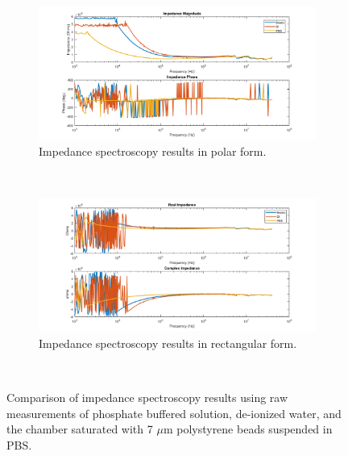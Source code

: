 \begin{figure}[h]
    \centering
    \begin{subfigure}[b]{\textwidth}
        \centering
        \includegraphics[width=\textwidth]{images/raw_IS_data_mag_phase.png}
        \caption{Impedance spectroscopy results in polar form.}
    \end{subfigure}
    \\
    \vspace{0.1 in}
    \begin{subfigure}[b]{\textwidth}
        \centering
        \includegraphics[width=\textwidth]{images/raw_IS_data_real_imag.png}
        \caption{Impedance spectroscopy results in rectangular form.}
    \end{subfigure}
    \\
    \caption[PBS, DI, microbead IS Raw data comparison.]{Comparison of impedance spectroscopy results using raw measurements of phosphate buffered solution, de-ionized water, and the chamber saturated with 7 $\mu$m polystyrene beads suspended in PBS.}
    \label{fig:IS_data_beads_pbs_DI_comp}
\end{figure}

